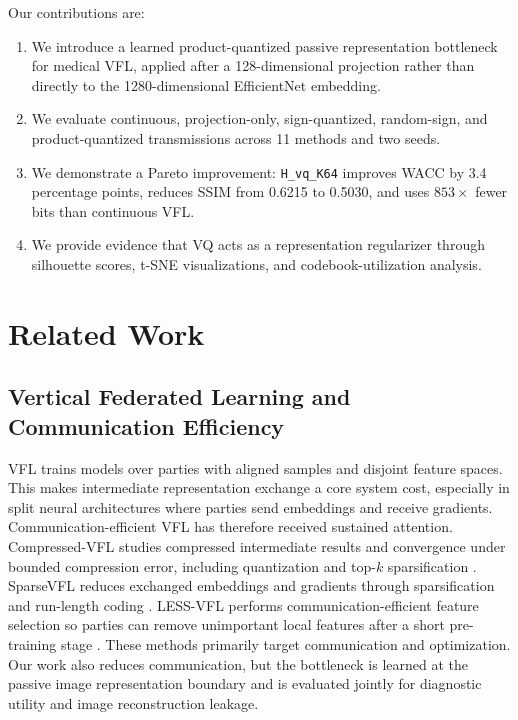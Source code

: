 \documentclass{article}
\begin{document}
Our contributions are:
\begin{enumerate}
    \item We introduce a learned product-quantized passive representation bottleneck for medical VFL, applied after a 128-dimensional projection rather than directly to the 1280-dimensional EfficientNet embedding.
    \item We evaluate continuous, projection-only, sign-quantized, random-sign, and product-quantized transmissions across 11 methods and two seeds.
    \item We demonstrate a Pareto improvement: \texttt{H\_vq\_K64} improves WACC by 3.4 percentage points, reduces SSIM from 0.6215 to 0.5030, and uses $853\times$ fewer bits than continuous VFL.
    \item We provide evidence that VQ acts as a representation regularizer through silhouette scores, t-SNE visualizations, and codebook-utilization analysis.
\end{enumerate}

\section{Related Work}

\subsection{Vertical Federated Learning and Communication Efficiency}

VFL trains models over parties with aligned samples and disjoint feature spaces. This makes intermediate representation exchange a core system cost, especially in split neural architectures where parties send embeddings and receive gradients. Communication-efficient VFL has therefore received sustained attention. Compressed-VFL studies compressed intermediate results and convergence under bounded compression error, including quantization and top-$k$ sparsification \citep{castiglia2022compressedvfl}. SparseVFL reduces exchanged embeddings and gradients through sparsification and run-length coding \citep{inoue2023sparsevfl}. LESS-VFL performs communication-efficient feature selection so parties can remove unimportant local features after a short pre-training stage \citep{castiglia2023lessvfl}. These methods primarily target communication and optimization. Our work also reduces communication, but the bottleneck is learned at the passive image representation boundary and is evaluated jointly for diagnostic utility and image reconstruction leakage.
\end{document}
